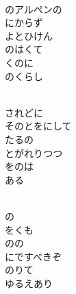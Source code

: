 \documentclass[10pt,b5j]{tarticle} %
\begin{document}
\vspace{1.5em} %
\newcommand{\linespace}{0.5em} %
\newcommand{\blocksize}{0.5\hsize} %
\newcommand{\itemmargin}{6em} %
\begin{enumerate} %
    \setlength{\itemindent}{\itemmargin} %
    \begin{minipage}[c]{\blocksize}
    
        \vspace{\linespace}
        \item~\\
        のアルペンの\\
        にからず\\
        よとひけん\\
        のはくて\\
        くのに\\
        のくらし
        
        \vspace{\linespace}
        \item~\\
        されどに\\
        そのとをにして\\
        たるの\\
        とがれりつつ\\
        をのは\\
        ある
        
        \vspace{\linespace}
        \item~\\
        の\\
        をくも\\
        のの\\
        にですべきぞ\\
        のりて\\
        ゆるえあり
        

\end{minipage}
\end{enumerate}
\end{document}
